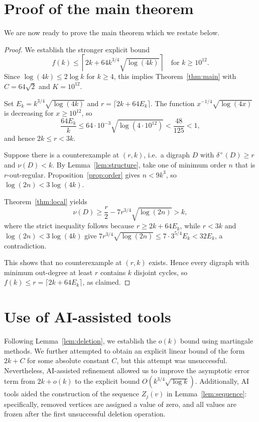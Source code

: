 \documentclass[a4paper,12pt]{article}
\numberwithin{equation}{section}
\begin{document}


\section{Proof of the main theorem}\label{sec:mainproof}

We are now ready to prove the main theorem which we restate below.

\MainThm*
\begin{proof}
We establish the stronger explicit bound
$$
f(k)\le\left\lceil2k+64k^{3/4}\sqrt{\log(4k)}\right\rceil
\quad\text{for }k\ge10^{12}.
$$
Since $\log(4k)\le2\log k$ for $k\ge4$, this implies
Theorem~\ref{thm:main} with $C=64\sqrt2$ and $K=10^{12}$.

Set $E_k=k^{3/4}\sqrt{\log(4k)}$ and $r=\lceil2k+64E_k\rceil$.
The function $x^{-1/4}\sqrt{\log(4x)}$ is decreasing for $x\ge10^{12}$, so
$$
\frac{64E_k}{k}\le64\cdot10^{-3}\sqrt{\log(4\cdot10^{12})}<\frac{48}{125}<1,
$$
and hence $2k\le r<3k$.

Suppose there is a counterexample at $(r,k)$,
i.e.\ a digraph $D$ with $\delta^+(D)\ge r$ and $\nu(D)<k$. By
Lemma~\ref{lem:structure}, take one of minimum order $n$ that is
$r$-out-regular. Proposition~\ref{prop:order} gives $n<9k^3$, so
$\log(2n)<3\log(4k)$.

Theorem~\ref{thm:local} yields
$$
\nu(D)\ge\frac r2-7r^{3/4}\sqrt{\log(2n)}>k,
$$
where the strict inequality follows because $r\ge2k+64E_k$, while
$r<3k$ and $\log(2n)<3\log(4k)$ give
$7r^{3/4}\sqrt{\log(2n)}\le7\cdot3^{5/4}E_k<32E_k$, a contradiction.

This shows that no counterexample at $(r,k)$ exists. Hence every
digraph with minimum out-degree at least $r$ contains $k$ disjoint
cycles, so $f(k)\le r=\lceil2k+64E_k\rceil$, as claimed.
\end{proof}



\section*{Use of AI-assisted tools} 

Following Lemma~\ref{lem:deletion}, we establish the $o(k)$ bound using martingale methods. We further attempted to obtain an explicit linear bound of the form $2k+C$ for some absolute constant $C$, but this attempt was unsuccessful. Nevertheless, AI-assisted refinement allowed us to improve the asymptotic error term from $2k+o(k)$ to the explicit bound $O(k^{3/4}\sqrt{\log k})$. Additionally, AI tools aided the construction of the sequence $Z_j(v)$ in Lemma~\ref{lem:sequence}: specifically, removed vertices are assigned a value of zero, and all values are frozen after the first unsuccessful deletion operation.
\end{document}
